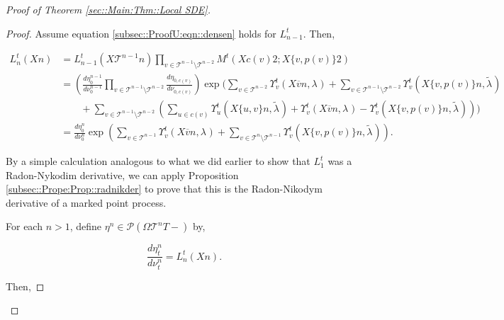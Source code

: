 \documentclass[12pt]{article}
\newcommand{\mc}{\mathcal}
\newcommand{\ov}{\overline}
\newcommand{\ind}{\hspace{24pt}}
\newcommand{\pmsr}{\mc{P}}							%
\renewcommand{\v}{v}							%
\newcommand{\vv}{u}								%
\newcommand{\T}{T}								%
\renewcommand{\t}{t}							%
\newcommand{\X}{X}								%
\newcommand{\cl}{\ov}							%
\newcommand{\pup}[1]{^{#1}}							%
\newcommand{\tree}{\mc{T}}							%
\newcommand{\numb}{n}								%
\newcommand{\mm}[3]{\nu_{#2#1}^{#3}}						%
\newcommand{\mmm}[3]{\eta_{#2#1}^{#3}}						%
\newcommand{\rate}[1]{\lambda_{#1}}					%
\newcommand{\crate}[2]{\alt{\lambda}_{#1}^{#2}}		%
\newcommand{\alt}{\widetilde}						%
\newcommand{\dense}[2]{L_{#1}^{#2}}				%
\newcommand{\cdense}[2]{M_{#1}^{#2}}			%
\newcommand{\ds}[2]{\Upsilon_{#1}^{#2}}			%
\renewcommand{\c}[1]{c(#1)}						%
\newcommand{\p}[1]{p(#1)}						%
\begin{document}
\begin{proof}[Proof of Theorem \ref{sec::Main:Thm::Local SDE}]
\begin{proof}
Assume equation \eqref{subsec::ProofU:eqn::densen} holds for \(\dense{\numb-1}{\t}\). Then,

\begin{align*}
\dense{\numb}{\t}(\X{}{}{\numb}) &= \dense{\numb-1}{\t}(\X{\tree\pup{\numb-1}}{}{\numb})\prod_{\v\in\tree\pup{\numb-1}\setminus\tree\pup{\numb-2}} \cdense{}{\t}(\X{\c{\v}}{}{2};\X{\{\v,\p{\v}\}}{}{2})\\
&=\left(\frac{d\mmm{}{0}{\numb-1}}{d\mm{}{0}{\numb-1}}\prod_{\v\in\tree\pup{\numb-1}\setminus\tree\pup{\numb-2}}\frac{d\mmm{\c{\v}}{0,}{}}{d\mm{\c{\v}}{0,}{}}\right)\exp\Bigg(\sum_{\v\in\tree\pup{\numb-2}}\ds{\v}{\t}(\X{\cl{\v}}{}{\numb},\rate{}) + \sum_{\v\in\tree\pup{\numb-1}\setminus\tree\pup{\numb-2}} \ds{\v}{\t}(\X{\{\v,\p{\v}\}}{}{\numb},\crate{}{})\\
&\ind + \sum_{\v\in\tree\pup{\numb-1}\setminus\tree\pup{\numb-2}}\left(\sum_{\vv\in \c{\v}} \ds{\vv}{\t}(\X{\{\vv,\v\}}{}{\numb},\crate{}{}) + \ds{\v}{\t}(\X{\cl{\v}}{}{\numb},\rate{}) - \ds{\v}{\t}(\X{\{\v,\p{\v}\}}{}{\numb},\crate{}{})\right)\Bigg)\\
&=\frac{d\mmm{}{0}{\numb}}{d\mm{}{0}{\numb}}\exp\left(\sum_{\v\in\tree\pup{\numb-1}}\ds{\v}{\t}(\X{\cl{\v}}{}{\numb},\rate{}) + \sum_{\v\in\tree\pup{\numb}\setminus\tree\pup{\numb-1}} \ds{\v}{\t}(\X{\{\v,\p{\v}\}}{}{\numb},\crate{}{})\right).
\end{align*}

By a simple calculation analogous to what we did earlier to show that \(\dense{1}{\t}\) was a Radon-Nykodim derivative, we can apply Proposition \ref{subsec::Prope:Prop::radnikder} to prove that this is the Radon-Nikodym derivative of a marked point process. 

\ind For each \(\numb > 1\), define \(\mmm{}{}{\numb} \in \pmsr(\Omega{\tree\pup{\numb}}{\T-})\) by,

\[\frac{d\mmm{}{\t}{\numb}}{d\mm{}{\t}{\numb}} = \dense{\numb}{\t}(\X{}{}{\numb}).\]

Then,


\end{proof}
\end{proof}
\end{document}
